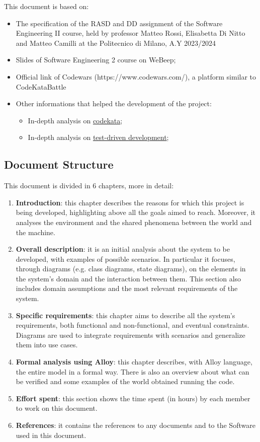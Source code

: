 This document is based on: 
\begin{itemize}
    \item The specification of the RASD and DD assignment of the Software Engineering II course, held by professor Matteo Rossi, Elisabetta Di Nitto and Matteo Camilli at the Politecnico di Milano, A.Y 2023/2024
    \item Slides of Software Engineering 2 course on WeBeep;
    \item Official link of Codewars (https://www.codewars.com/), a platform similar to CodeKataBattle
    \item Other informations that helped the development of the project: 
    \begin{itemize}
        \item In-depth analysis on \href{http://codekata.com/}{codekata};
        \item In-depth analysis on \href{https://en.wikipedia.org/wiki/Test-driven\textunderscore development}{test-driven development};
    \end{itemize}
\end{itemize}

\vspace{24pt}

\subsection{Document Structure}

This document is divided in 6 chapters, more in detail:
\begin{enumerate}
    \item \textbf{Introduction}: this chapter describes the reasons for which this project is being developed, highlighting above all the goals aimed to reach. Moreover, it analyses the environment and the shared phenomena between the world and the machine.
    \item \textbf{Overall description}: it is an initial analysis about the system to be developed, with examples of possible scenarios. In particular it focuses, through diagrams (e.g. class diagrams, state diagrams), on the elements in the system's domain and the interaction between them. This section also includes domain assumptions and the most relevant requirements of the system.
    \item \textbf{Specific requirements}: this chapter aims to describe all the system's requirements, both functional and non-functional, and eventual constraints. Diagrams are used to integrate requirements with scenarios and generalize them into use cases. 
    \item \textbf{Formal analysis using Alloy}: this chapter describes, with Alloy language, the entire model in a formal way. There is also an overview about what can be verified and some examples of the world obtained running the code.
    \item \textbf{Effort spent}: this section shows the time spent (in hours) by each member to work on this document.
    \item \textbf{References}: it contains the references to any documents and to the Software used in this document.
\end{enumerate}
